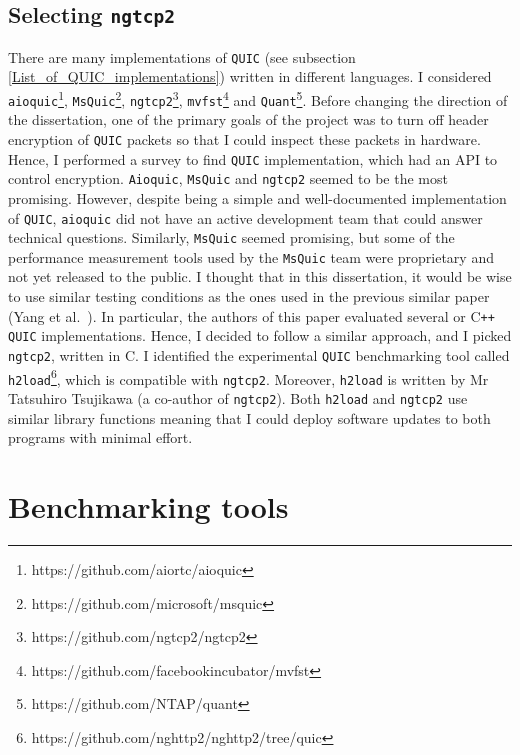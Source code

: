 \documentclass[12pt,a4paper,twoside,openright]{report}
\begin{document}
\subsection{Selecting  \texttt{ngtcp2}}
There are many implementations of \texttt{QUIC} (see subsection \ref{List_of_QUIC_implementations}) written in different languages.
I considered  \texttt{aioquic}\footnote{https://github.com/aiortc/aioquic},  \texttt{MsQuic}\footnote{https://github.com/microsoft/msquic},  \texttt{ngtcp2}\footnote{https://github.com/ngtcp2/ngtcp2},  \texttt{mvfst}\footnote{https://github.com/facebookincubator/mvfst} and \texttt{Quant}\footnote{https://github.com/NTAP/quant}.
Before changing the direction of the dissertation, one of the primary goals of the project was to turn off header encryption of \texttt{QUIC} packets so that I could inspect these packets in hardware.
Hence, I performed a survey to find \texttt{QUIC} implementation, which had an API to control encryption. 
\texttt{Aioquic}, \texttt{MsQuic} and \texttt{ngtcp2} seemed to be the most promising.
However, despite being a simple and well-documented implementation of \texttt{QUIC}, \texttt{aioquic} did not have an active development team that could answer technical questions.
Similarly, \texttt{MsQuic} seemed promising, but some of the performance measurement tools used by the \texttt{MsQuic} team were proprietary and not yet released to the public. 
I thought that in this dissertation, it would be wise to use similar testing conditions as the ones used in the previous similar paper (Yang et al.~\cite{Making_QUIC_Quicker}).
In particular, the authors of this paper evaluated several  or C\texttt{++} \texttt{QUIC} implementations.
Hence, I decided to follow a similar approach, and I picked \texttt{ngtcp2}, written in C.
I identified the experimental \texttt{QUIC} benchmarking tool called \texttt{h2load}\footnote{https://github.com/nghttp2/nghttp2/tree/quic}, which is compatible with \texttt{ngtcp2}.
Moreover, \texttt{h2load} is written by Mr Tatsuhiro  Tsujikawa (a co-author of \texttt{ngtcp2}).
Both \texttt{h2load} and \texttt{ngtcp2} use similar library functions meaning that I could deploy software updates to both programs with minimal effort.





\section{Benchmarking tools}
\end{document}
